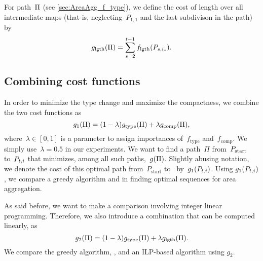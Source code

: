 For path~$\Pi$ (see \sect\ref{sec:AreaAgg_f_type}), 
we define the cost of length over all 
intermediate maps 
(that is, neglecting~$P_{1,1}$ 
and the last subdivison in the path) by
\begin{equation}
\label{eq:g_length}
g_\mathrm{lgth}(\Pi)=
\sum_{s=2}^{t-1}f_{\mathrm{lgth}}(P_{s,i_s}).
\end{equation}



\subsection{Combining cost functions}
\label{sec:AreaAgg_Combining}
In order to minimize the type change 
and maximize the compactness,
we combine the two cost functions as
\begin{equation}
\label{eq:g_1}
g_1(\Pi)= (1-\lambda)g_\mathrm{type}(\Pi)
+\lambda g_\mathrm{comp}(\Pi),
\end{equation}
where~$\lambda \in [0,1]$ is a parameter 
to assign importances 
of~$f_\mathrm{type}$ and~$f_\mathrm{comp}$.
We simply use~$\lambda=0.5$ in our experiments. 
We want to find a path~$\Pi$ from~$P_\mathrm{start}$ to~$P_{t,i}$ 
that minimizes, among all such paths,~$g(\Pi)$.
Slightly abusing notation, we denote the cost of
this optimal path from~${P}_{\mathrm{start}}$ to~\Pnode 
by~$g_1(P_{t,i})$.
Using $g_1(P_{t,i})$, we compare a greedy algorithm and \Astar
in finding optimal sequences for area aggregation.

As said before, we want to make a comparison involving
integer linear programming.
Therefore, we also introduce a combination
that can be computed linearly, as
\begin{equation}
\label{eq:g_2}
g_2(\Pi)= (1-\lambda)g_\mathrm{type}(\Pi)
+\lambda g_\mathrm{lgth}(\Pi).
\end{equation}
We compare the greedy algorithm, \Astar, and an ILP-based 
algorithm using $g_2$.



